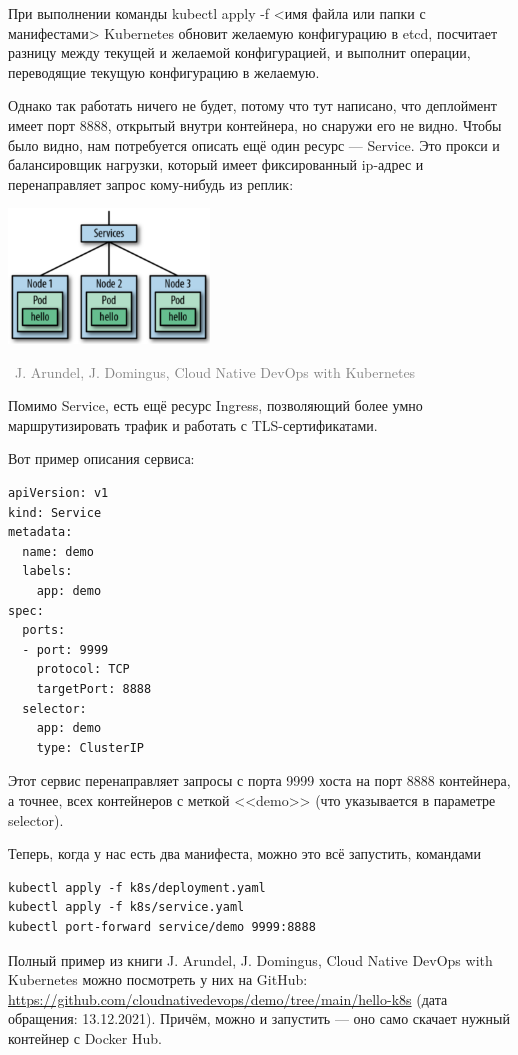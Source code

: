 \documentclass[a5paper]{article}
\newcommand{\attribution}[1] {
    \vspace{-5mm}\begin{flushright}\begin{scriptsize}\textcolor{gray}{\textcopyright\, #1}\end{scriptsize}\end{flushright}
}
\begin{document}
При выполнении команды kubectl apply -f <имя файла или папки с манифестами> Kubernetes обновит желаемую конфигурацию в etcd, посчитает разницу между текущей и желаемой конфигурацией, и выполнит операции, переводящие текущую конфигурацию в желаемую.

Однако так работать ничего не будет, потому что тут написано, что деплоймент имеет порт 8888, открытый внутри контейнера, но снаружи его не видно. Чтобы было видно, нам потребуется описать ещё один ресурс --- Service. Это прокси и балансировщик нагрузки, который имеет фиксированный ip-адрес и перенаправляет запрос кому-нибудь из реплик:

\begin{center}
    \includegraphics[width=0.4\textwidth]{kubernetesServices.png}
    \attribution{J. Arundel, J. Domingus, Cloud Native DevOps with Kubernetes}
\end{center}

Помимо Service, есть ещё ресурс Ingress, позволяющий более умно маршрутизировать трафик и работать с TLS-сертификатами.

Вот пример описания сервиса:

\begin{verbatim}
apiVersion: v1
kind: Service
metadata:
  name: demo
  labels:
    app: demo
spec:
  ports:
  - port: 9999
    protocol: TCP
    targetPort: 8888
  selector:
    app: demo
    type: ClusterIP
\end{verbatim}

Этот сервис перенаправляет запросы с порта 9999 хоста на порт 8888 контейнера, а точнее, всех контейнеров с меткой <<demo>> (что указывается в параметре selector).

Теперь, когда у нас есть два манифеста, можно это всё запустить, командами

\begin{verbatim}
kubectl apply -f k8s/deployment.yaml
kubectl apply -f k8s/service.yaml
kubectl port-forward service/demo 9999:8888
\end{verbatim}

Полный пример из книги J. Arundel, J. Domingus, Cloud Native DevOps with Kubernetes можно посмотреть у них на GitHub: \url{https://github.com/cloudnativedevops/demo/tree/main/hello-k8s} (дата обращения: 13.12.2021). Причём, можно и запустить --- оно само скачает нужный контейнер с Docker Hub. 
\end{document}
